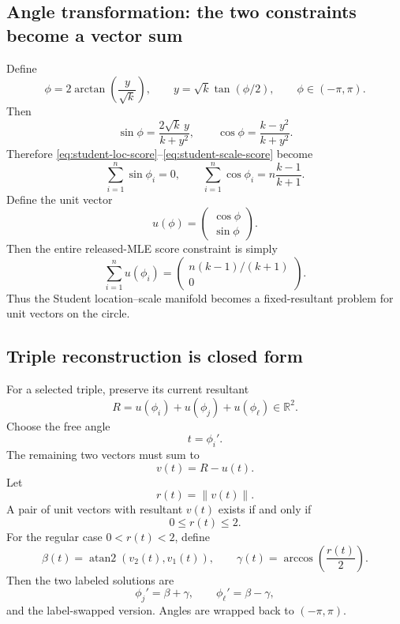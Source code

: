 \documentclass[11pt]{article}
\newcommand{\R}{\mathbb{R}}
\newcommand{\1}{\mathbf{1}}
\newcommand{\atanTwo}{\operatorname{atan2}}
\begin{document}
\subsection{Angle transformation: the two constraints become a vector sum}

Define
\begin{equation}
\boxed{
    \phi
    =2\arctan\!\left(\frac{y}{\sqrt{k}}\right),
    \qquad
    y=\sqrt{k}\tan(\phi/2),
    \qquad
    \phi\in(-\pi,\pi).
}
\end{equation}
Then
\[
    \sin\phi
    =\frac{2\sqrt{k}\,y}{k+y^2},
    \qquad
    \cos\phi
    =\frac{k-y^2}{k+y^2}.
\]
Therefore \eqref{eq:student-loc-score}--\eqref{eq:student-scale-score} become
\begin{equation}
\boxed{
    \sum_{i=1}^n \sin\phi_i=0,
    \qquad
    \sum_{i=1}^n \cos\phi_i
    =n\frac{k-1}{k+1}.
}
\end{equation}
Define the unit vector
\begin{equation}
\boxed{
    u(\phi)
    =
    \begin{pmatrix}
        \cos\phi\\
        \sin\phi
    \end{pmatrix}.
}
\end{equation}
Then the entire released-MLE score constraint is simply
\begin{equation}
\boxed{
    \sum_{i=1}^n u(\phi_i)
    =
    \begin{pmatrix}
    n(k-1)/(k+1)\\0
    \end{pmatrix}.
}
\label{eq:student-resultant}
\end{equation}
Thus the Student location--scale manifold becomes a fixed-resultant problem for unit vectors on the circle.

\subsection{Triple reconstruction is closed form}

For a selected triple, preserve its current resultant
\begin{equation}
\boxed{
    R
    =u(\phi_i)+u(\phi_j)+u(\phi_\ell)\in\R^2.
}
\end{equation}
Choose the free angle
\[
    t=\phi_i'.
\]
The remaining two vectors must sum to
\[
    v(t)=R-u(t).
\]
Let
\[
    r(t)=\|v(t)\|.
\]
A pair of unit vectors with resultant $v(t)$ exists if and only if
\[
    0\le r(t)\le 2.
\]
For the regular case $0<r(t)<2$, define
\begin{equation}
\boxed{
    \beta(t)=\atanTwo(v_2(t),v_1(t)),
    \qquad
    \gamma(t)=\arccos\!\left(\frac{r(t)}{2}\right).
}
\end{equation}
Then the two labeled solutions are
\begin{equation}
\boxed{
    \phi_j'=\beta+\gamma,
    \qquad
    \phi_\ell'=\beta-\gamma,
}
\label{eq:student-angle-pair}
\end{equation}
and the label-swapped version.  Angles are wrapped back to $(-\pi,\pi)$.
\end{document}
